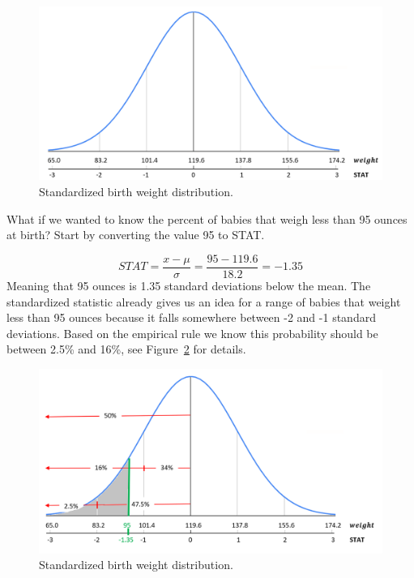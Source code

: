\documentclass[
  letterpaper,
  DIV=11,
  numbers=noendperiod]{scrreprt}
\theoremstyle{definition}
\theoremstyle{remark}
\begin{document}
\begin{figure}

{\centering \includegraphics{images/standardization2.png}

}

\caption{\label{fig-standardization2}Standardized birth weight
distribution.}

\end{figure}

What if we wanted to know the percent of babies that weigh less than 95
ounces at birth? Start by converting the value 95 to STAT.

\[STAT = \frac{x-\mu}{\sigma} = \frac{95-119.6}{18.2}= -1.35\] Meaning
that 95 ounces is 1.35 standard deviations below the mean. The
standardized statistic already gives us an idea for a range of babies
that weight less than 95 ounces because it falls somewhere between -2
and -1 standard deviations. Based on the empirical rule we know this
probability should be between 2.5\% and 16\%, see
Figure~\ref{fig-standardization3} for details.

\begin{figure}

{\centering \includegraphics{images/standardization3.png}

}

\caption{\label{fig-standardization3}Standardized birth weight
distribution.}

\end{figure}
\end{document}
